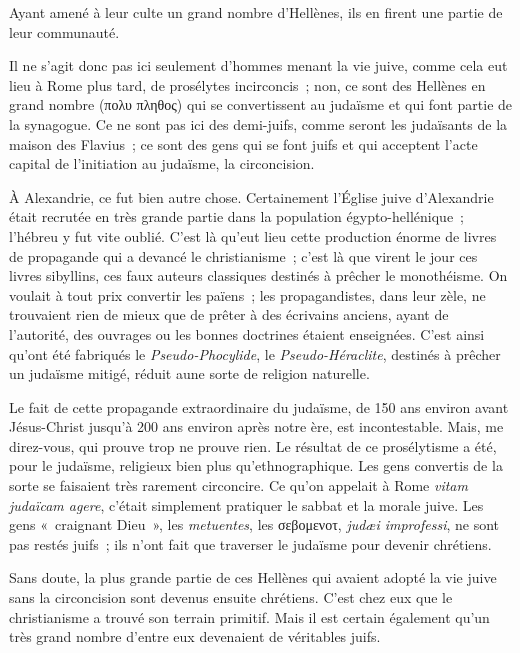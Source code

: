\documentclass[french,twoside]{book} %
\newcommand\foreign[1]{\emph{#1}}
\newcommand\orgName[1]{#1}
\newcommand\placeName[1]{#1}
\newenvironment{quoteblock}%
  {\begin{quoting}}
  {\end{quoting}}
\newenvironment{quotebar}{%
    \def\FrameCommand{{\color{rubric!10!}\vrule width 0.5em} \hspace{0.9em}}%
    \def\OuterFrameSep{\itemsep} %
    \MakeFramed {\advance\hsize-\width \FrameRestore}
  }%
  {%
    \endMakeFramed
  }
\renewenvironment{quoteblock}%
  {%
    \savenotes
    \setstretch{0.9}
    \normalfont
    \begin{quotebar}
  }
  {%
    \end{quotebar}
    \spewnotes
  }
\begin{document}
\begin{quoteblock}
 \noindent Ayant amené à leur culte un grand nombre d’Hellènes, ils en firent une partie de leur communauté.
 \end{quoteblock}

\noindent Il ne s’agit donc pas ici seulement d’hommes menant la vie juive, comme cela eut lieu à {\placeName Rome} plus tard, de prosélytes incirconcis ; non, ce sont des {\orgName Hellènes} en grand nombre (πολυ πληθος) qui se convertissent au judaïsme et qui font partie de la synagogue. Ce ne sont pas ici des demi-juifs, comme seront les judaïsants de la maison des {\orgName Flavius} ; ce sont des gens qui se font juifs et qui acceptent l’acte capital de l’initiation au judaïsme, la circoncision.\par
À {\placeName Alexandrie}, ce fut bien autre chose. Certainement l’{\orgName Église juive d’Alexandrie} était recrutée en très grande partie dans la population égypto-hellénique ; l’hébreu y fut vite oublié. C’est là qu’eut lieu cette production énorme de livres de propagande qui a devancé le christianisme ; c’est là que virent le jour ces livres sibyllins, ces faux auteurs classiques destinés à prêcher le monothéisme. On voulait à tout prix convertir les païens ; les propagandistes, dans leur zèle, ne trouvaient rien de mieux que de prêter à des écrivains anciens, ayant de l’autorité, des ouvrages ou les bonnes doctrines étaient enseignées. C’est ainsi qu’ont été fabriqués le {\itshape Pseudo-Phocylide}, le {\itshape Pseudo-Héraclite}, destinés à prêcher un judaïsme mitigé, réduit aune sorte de religion naturelle.\par
Le fait de cette propagande extraordinaire du judaïsme, de 150 ans environ avant Jésus-Christ jusqu’à 200 ans environ après notre ère, est incontestable. Mais, me direz-vous, qui prouve trop ne prouve rien. Le résultat de ce prosélytisme a été, pour le judaïsme, religieux bien plus qu’ethnographique. Les gens convertis de la sorte se faisaient très rarement circoncire. Ce qu’on appelait à {\placeName Rome} \foreign{{\itshape vitam judaïcam agere}}, c’était simplement pratiquer le sabbat et la morale juive. Les gens « craignant Dieu », les {\itshape metuentes}, les σεβομενοτ, {\itshape judæi improfessi}, ne sont pas restés juifs ; ils n’ont fait que traverser le judaïsme pour devenir chrétiens.\par
Sans doute, la plus grande partie de ces {\orgName Hellènes} qui avaient adopté la vie juive sans la circoncision sont devenus ensuite chrétiens. C’est chez eux que le christianisme a trouvé son terrain primitif. Mais il est certain également qu’un très grand nombre d’entre eux devenaient de véritables juifs.\par
\end{document}

